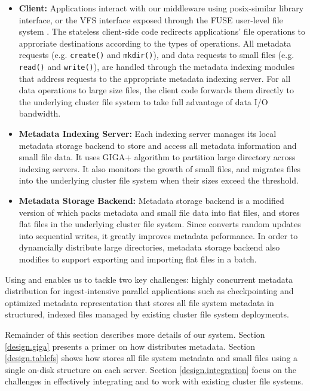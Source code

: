 \begin{itemize}
\item{\textbf{Client:}} Applications interact with our middleware
using posix-similar library interface, or the VFS interface exposed
through the FUSE user-level file system \cite{fuse}.
The stateless client-side code redirects applications' file operations
to approriate destinations according to the types of operations.
All metadata requests (e.g. \texttt{create()} and \texttt{mkdir()}),
and data requests to small files (e.g. \texttt{read()} and \texttt{write()}),
are handled through the metadata indexing modules that address
requests to the appropriate metadata indexing server.
For all data operations to large size files, the client code forwards
them directly to the underlying cluster file system to take full
advantage of data I/O bandwidth.

\item{\textbf{Metadata Indexing Server:}}
Each indexing server manages its local metadata storage backend to store and
access all metadata information and small file data. It uses GIGA+ algorithm to
partition large directory across indexing servers. It also monitors the growth
of small files, and migrates files into the underlying cluster file system
when their sizes exceed the threshold.

\item{\textbf{Metadata Storage Backend:}}
Metadata storage backend is a modified version of \tfs which packs metadata and
small file data into flat files, and stores flat files
in the underlying cluster file system. Since \tfs converts random updates into
sequential writes, it greatly improves metadata peformance. In order to
dynamcially distribute large directories, metadata storage backend also modifies
\tfs to support exporting and importing flat files in a batch.

\end{itemize}


Using \giga and \tfs enables us to tackle two key challenges: highly
concurrent metadata distribution for ingest-intensive parallel applications
such as checkpointing \cite{PLFS} and
optimized metadata representation that stores all file system
metadata in structured, indexed files managed by existing cluster file system
deployments.

Remainder of this section describes more details of our system.
Section \ref{design.giga} presents a primer on how \giga distributes metadata.
Section \ref{design.tablefs} shows how \tfs stores all file system metadata
and small files using a single on-disk structure on each server.
Section \ref{design.integration} focus on the challenges in effectively
integrating \giga and \tfs to work with existing cluster file systems.


